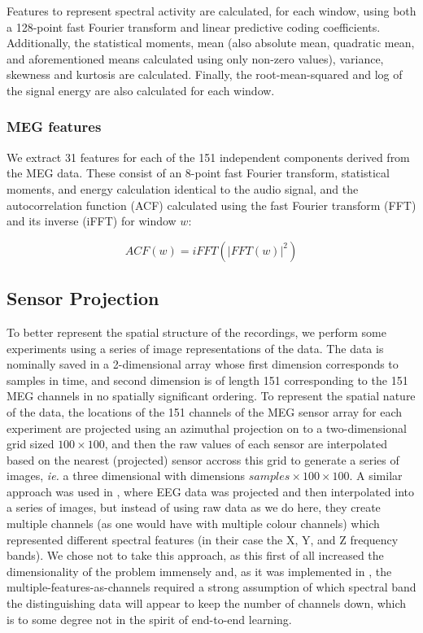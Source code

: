 \documentclass[utf8]{frontiersSCNS} %
\begin{document}
Features to represent spectral activity are calculated, for each window, using both a 128-point fast Fourier transform and linear predictive coding coefficients. Additionally, the statistical moments, mean (also absolute mean, quadratic mean, and aforementioned means calculated using only non-zero values), variance, skewness and kurtosis are calculated. Finally, the root-mean-squared and log of the signal energy are also calculated for each window.

\subsubsection{MEG features}

We extract 31 features for each of the 151 independent components derived from the MEG data. These consist of an 8-point fast Fourier transform, statistical moments, and energy calculation identical to the audio signal, and the autocorrelation function (ACF) calculated using the fast Fourier transform (FFT) and its inverse (iFFT) for window $w$:


\begin{equation}
  ACF(w) = iFFT(|FFT(w)|^2)
  \label{eq1}
\end{equation}

\subsection{Sensor Projection}

To better represent the spatial structure of the recordings, we perform some experiments using a series of image representations of the data. The data is nominally saved in a 2-dimensional array whose first dimension corresponds to samples in time, and second dimension is of length 151 corresponding to the 151 MEG channels in no spatially significant ordering. To represent the spatial nature of the data, the locations of the 151 channels of the MEG sensor array for each experiment are projected using an azimuthal projection on to a two-dimensional grid sized $100 \times 100$, and then the raw values of each sensor are  interpolated based on the nearest (projected) sensor accross this grid to generate a series of images, \emph{ie.} a three dimensional with dimensions $samples \times  100 \times 100$. A similar approach was used in \cite{}, where EEG data was projected and then interpolated into a series of images, but instead of using raw data as we do here, they create multiple channels (as one would have with multiple colour channels) which represented different spectral features (in their case the X, Y, and Z frequency bands). We chose not to take this approach, as this first of all increased the dimensionality of the problem immensely and, as it was implemented in \cite{}, the multiple-features-as-channels required a strong assumption of which spectral band the distinguishing data will appear to keep the number of channels down, which is to some degree not in the spirit of end-to-end learning.
\end{document}
